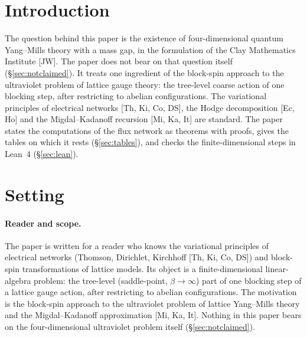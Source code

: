 \documentclass[11pt,a4paper]{article}
\theoremstyle{definition}
\theoremstyle{remark}
\begin{document}
\begin{abstract}
For several steps the answer depends on the blocking rule.
With the sum of the two fine links as coarse link, the computed cone factor exceeds $1$ at the third step ($1.26$) and the coarse covariance has no fixed point.
With a gauge-covariant averaging rule, the covariance flow approaches a fixed point (computed exactly for $k\le5$; no existence proof is given), and the computed lower bounds of the cone factor stay between $0.57$ and $0.64$, while an upper bound below $1$ is open.
We also classify the tail of non-local coarse weights (flat, exponential or power-law) according to how the coarse variable carries conserved quantities and constraints.
The finite-dimensional inequalities and bookkeeping are checked in Lean~4 with Mathlib.
Projections, interpolation and all numerical values are outside Lean.
\end{abstract}

\section{Introduction}\label{sec:intro}

The question behind this paper is the existence of four-dimensional quantum Yang--Mills theory with a mass gap, in the formulation of the Clay Mathematics Institute [JW].
The paper does not bear on that question itself (\S\ref{sec:notclaimed}).
It treats one ingredient of the block-spin approach to the ultraviolet problem of lattice gauge theory: the tree-level coarse action of one blocking step, after restricting to abelian configurations.
The variational principles of electrical networks [Th, Ki, Co, DS], the Hodge decomposition [Ec, Ho] and the Migdal--Kadanoff recursion [Mi, Ka, It] are standard.
The paper states the computations of the flux network as theorems with proofs, gives the tables on which it rests (\S\ref{sec:tables}), and checks the finite-dimensional steps in Lean~4 (\S\ref{sec:lean}).

\section{Setting}\label{sec:setting}

\paragraph{Reader and scope.}
The paper is written for a reader who knows the variational principles of electrical networks (Thomson, Dirichlet, Kirchhoff [Th, Ki, Co, DS]) and block-spin transformations of lattice models.
Its object is a finite-dimensional linear-algebra problem: the tree-level (saddle-point, $\beta\to\infty$) part of one blocking step of a lattice gauge action, after restricting to abelian configurations.
The motivation is the block-spin approach to the ultraviolet problem of lattice Yang--Mills theory and the Migdal--Kadanoff approximation [Mi, Ka, It].
Nothing in this paper bears on the four-dimensional ultraviolet problem itself (\S\ref{sec:notclaimed}).
\end{document}
